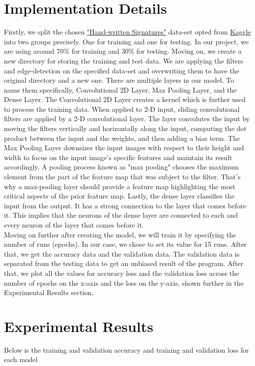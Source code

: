 \documentclass[conference]{IEEEtran}
\begin{document}
\section{Implementation Details}

Firstly, we split the chosen \href{https://www.kaggle.com/datasets/divyanshrai/handwritten-signatures}{"Hand-written Signatures"} data-set opted from \href{https://www.kaggle.com/}{Kaggle} into two groups precisely. One for training and one for testing. In our project, we are using around 70\% for training and 30\% for testing. Moving on, we create a new directory for storing the training and test data. We are applying the filters and edge-detection on the specified data-set and overwriting them to have the original directory and a new one. There are multiple layers in our model. To name them specifically, Convolutional 2D Layer, Max Pooling Layer, and the Dense Layer. The Convolutional 2D Layer creates a kernel which is further used to process the training data. When applied to 2-D input, sliding convolutional filters are applied by a 2-D convolutional layer. The layer convolutes the input by moving the filters vertically and horizontally along the input, computing the dot product between the input and the weights, and then adding a bias term. The Max Pooling Layer downsizes the input images with respect to their height and width to focus on the input image's specific features and maintain its result accordingly. A pooling process known as "max pooling" chooses the maximum element from the part of the feature map that was subject to the filter. That's why a max-pooling layer should provide a feature map highlighting the most critical aspects of the prior feature map. Lastly, the dense layer classifies the input from the output. It has a strong connection to the layer that comes before it. This implies that the neurons of the dense layer are connected to each and every neuron of the layer that comes before it.\\ Moving on further after creating the model, we will train it by specifying the number of runs (epochs). In our case, we chose to set its value for 15 runs. After that, we get the accuracy data and the validation data. The validation data is separated from the testing data to get an unbiased result of the program. After that, we plot all the values for accuracy loss and the validation loss across the number of epochs on the x-axis and the loss on the y-axis, shown further in the Experimental Results section. 

\section{Experimental Results}
Below is the training and validation accuracy and training and validation loss for each model
\end{document}

